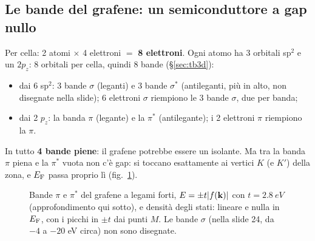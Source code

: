 \documentclass[11pt,a4paper]{article}
\begin{document}
\subsection{Le bande del grafene: un semiconduttore a gap nullo}\label{sec:grafenebande}
Per cella: 2 atomi $\times$ 4 elettroni $=$ \textbf{8 elettroni}. Ogni atomo ha 3 orbitali sp$^2$ e un $2p_z$: 8 orbitali per cella, quindi 8 bande
(§\ref{sec:tb3d}):
\begin{itemize}
\item dai 6 sp$^2$: 3 bande $\sigma$ (leganti) e 3 bande $\sigma^*$ (antileganti, più in alto, non disegnate nella slide); 6 elettroni $\sigma$ riempiono
le 3 bande $\sigma$, due per banda;
\item dai 2 $p_z$: la banda $\pi$ (legante) e la $\pi^*$ (antilegante); i 2 elettroni $\pi$ riempiono la $\pi$.
\end{itemize}
In tutto \textbf{4 bande piene}: il grafene potrebbe essere un isolante. Ma tra la banda $\pi$ piena e la $\pi^*$ vuota non c'è gap: si toccano
esattamente ai vertici $K$ (e $K'$) della zona, e $E_{\mathrm F}$ passa proprio lì (fig.~\ref{fig:grafenebande}).

\begin{figure}[tbp]
\centering{}
\caption{Bande $\pi$ e $\pi^*$ del grafene a legami forti, $E=\pm t|f(\mathbf k)|$ con $t=\SI{2.8}{eV}$ (approfondimento qui sotto), e densità degli stati: lineare e nulla in
$E_{\mathrm F}$, con i picchi in $\pm t$ dai punti $M$. Le bande $\sigma$ (nella slide 24, da $-4$ a $-20$ eV circa) non sono disegnate.}\label{fig:grafenebande}
\end{figure}
\end{document}

